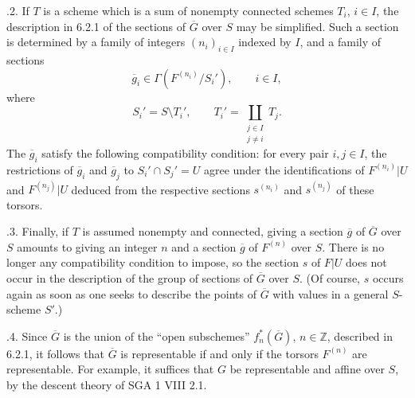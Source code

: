 \medskip
{}.2.  If $T$ is a scheme which is a sum of nonempty connected
schemes $T_i$, $i\in I$, the description in 6.2.1 of the sections of
$\overline G$ over $S$ may be simplified.  Such a section is determined by
a family of integers $(n_i)_{i\in I}$ indexed by $I$, and a family of
sections
\[
 \overline g_i\in\Gamma(F^{(n_i)}/S_i'),\qquad i\in I,
\]
where
\[
 S_i'=S\setminus T_i',
 \qquad
 T_i'=\coprod_{\substack{j\in I\\j\ne i}}T_j.
\]
The $\overline g_i$ satisfy the following compatibility condition: for every
pair $i,j\in I$, the restrictions of $\overline g_i$ and $\overline g_j$ to
$S_i'\cap S_j'=U$ agree under the identifications of $F^{(n_i)}|U$ and
$F^{(n_j)}|U$ deduced from the respective sections $s^{(n_i)}$ and
$s^{(n_j)}$ of these torsors.

\medskip
{}.3.  Finally, if $T$ is assumed nonempty and connected, giving a
section $\overline g$ of $\overline G$ over $S$ amounts to giving an integer
$n$ and a section $\overline g$ of $F^{(n)}$ over $S$.  There is no longer
any compatibility condition to impose, so the section $s$ of $F|U$ does not
occur in the description of the group of sections of $\overline G$ over
$S$.  (Of course, $s$ occurs again as soon as one seeks to describe the
points of $\overline G$ with values in a general $S$-scheme $S'$.)

\medskip
{}.4.  Since $\overline G$ is the union of the ``open
subschemes'' $f_n^*(\overline G)$, $n\in\mathbb Z$, described in 6.2.1, it
follows that $\overline G$ is representable if and only if the torsors
$F^{(n)}$ are representable.  For example, it suffices that $G$ be
representable and affine over $S$, by the descent theory of SGA 1 VIII 2.1.
